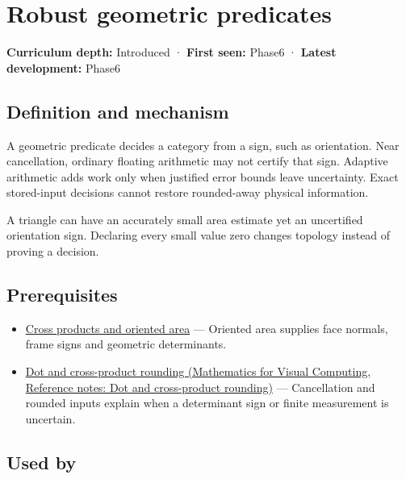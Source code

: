 \hypertarget{appendix-341296fb3f64}{}\label{referencestart:appendix-341296fb3f64}
\section{Robust geometric predicates}\label{appendix-341296fb3f64-robust-geometric-predicates}

\textbf{Curriculum depth:} Introduced · \textbf{First seen:} Phase6 · \textbf{Latest development:} Phase6

\begin{allmightroledefinition}

\subsection{Definition and mechanism}\label{appendix-341296fb3f64-definition-and-mechanism}

A geometric predicate decides a category from a sign, such as orientation. Near cancellation, ordinary floating arithmetic may not certify that sign. Adaptive arithmetic adds work only when justified error bounds leave uncertainty. Exact stored-input decisions cannot restore rounded-away physical information.

\end{allmightroledefinition}

A triangle can have an accurately small area estimate yet an uncertified orientation sign. Declaring every small value zero changes topology instead of proving a decision.

\subsection{Prerequisites}\label{appendix-341296fb3f64-prerequisites}

\begin{itemize}
\tightlist
\item
  \hyperref[appendix-2391db8052b1]{Cross products and oriented area} --- Oriented area supplies face normals, frame signs and geometric determinants.
\item
  \href{../02-Mathematics-for-Visual-Computing/main.pdf\#nameddest=appendix-5aef4f13483a}{Dot and cross-product rounding (Mathematics for Visual Computing, Reference notes: Dot and cross-product rounding)} --- Cancellation and rounded inputs explain when a determinant sign or finite measurement is uncertain.
\end{itemize}

\subsection{Used by}\label{appendix-341296fb3f64-used-by}


